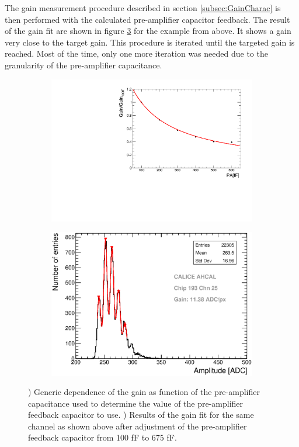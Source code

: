 The gain measurement procedure described in section \ref{subsec:GainCharac} is then performed with the calculated pre-amplifier capacitor feedback. The result of the gain fit are shown in figure \ref{fig:Gain675fF} for the example from above. It shows a gain very close to the target gain. This procedure is iterated until the targeted gain is reached. Most of the time, only one more iteration was needed due to the granularity of the pre-amplifier capacitance.

\begin{figure}[htbp!]
  \centering
  \begin{subfigure}[t]{0.49\textwidth}
    \includegraphics[width=1.\linewidth]{../Thesis_Plots/Commissioning/Plots/GainvsPA.pdf}
    \caption{} \label{fig:PA_curve}
  \end{subfigure}
  \hfill
  \begin{subfigure}[t]{0.49\textwidth}
    \includegraphics[width=1.\linewidth]{../Thesis_Plots/Commissioning/Plots/Gain675fF_MainzHBU4.eps}
    \caption{} \label{fig:Gain675fF}
  \end{subfigure}
  \caption{) Generic dependence of the gain as function of the pre-amplifier capacitance used to determine the value of the pre-amplifier feedback capacitor to use. ) Results of the gain fit for the same channel as shown above after adjustment of the pre-amplifier feedback capacitor from 100 fF to 675 fF.}
\end{figure}

